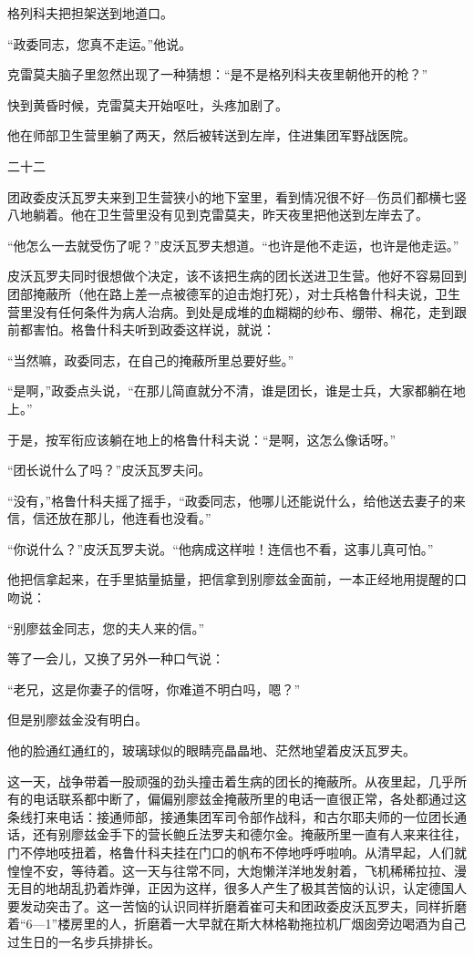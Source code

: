 格列科夫把担架送到地道口。

“政委同志，您真不走运。”他说。

克雷莫夫脑子里忽然出现了一种猜想：“是不是格列科夫夜里朝他开的枪？”

快到黄昏时候，克雷莫夫开始呕吐，头疼加剧了。

他在师部卫生营里躺了两天，然后被转送到左岸，住进集团军野战医院。

二十二

团政委皮沃瓦罗夫来到卫生营狭小的地下室里，看到情况很不好—伤员们都横七竖八地躺着。他在卫生营里没有见到克雷莫夫，昨天夜里把他送到左岸去了。

“他怎么一去就受伤了呢？”皮沃瓦罗夫想道。“也许是他不走运，也许是他走运。”

皮沃瓦罗夫同时很想做个决定，该不该把生病的团长送进卫生营。他好不容易回到团部掩蔽所（他在路上差一点被德军的迫击炮打死），对士兵格鲁什科夫说，卫生营里没有任何条件为病人治病。到处是成堆的血糊糊的纱布、绷带、棉花，走到跟前都害怕。格鲁什科夫听到政委这样说，就说：

“当然嘛，政委同志，在自己的掩蔽所里总要好些。”

“是啊，”政委点头说，“在那儿简直就分不清，谁是团长，谁是士兵，大家都躺在地上。”

于是，按军衔应该躺在地上的格鲁什科夫说：“是啊，这怎么像话呀。”

“团长说什么了吗？”皮沃瓦罗夫问。

“没有，”格鲁什科夫摇了摇手，“政委同志，他哪儿还能说什么，给他送去妻子的来信，信还放在那儿，他连看也没看。”

“你说什么？”皮沃瓦罗夫说。“他病成这样啦！连信也不看，这事儿真可怕。”

他把信拿起来，在手里掂量掂量，把信拿到别廖兹金面前，一本正经地用提醒的口吻说：

“别廖兹金同志，您的夫人来的信。”

等了一会儿，又换了另外一种口气说：

“老兄，这是你妻子的信呀，你难道不明白吗，嗯？”

但是别廖兹金没有明白。

他的脸通红通红的，玻璃球似的眼睛亮晶晶地、茫然地望着皮沃瓦罗夫。

这一天，战争带着一股顽强的劲头撞击着生病的团长的掩蔽所。从夜里起，几乎所有的电话联系都中断了，偏偏别廖兹金掩蔽所里的电话一直很正常，各处都通过这条线打来电话：接通师部，接通集团军司令部作战科，和古尔耶夫师的一位团长通话，还有别廖兹金手下的营长鲍丘法罗夫和德尔金。掩蔽所里一直有人来来往往，门不停地吱扭着，格鲁什科夫挂在门口的帆布不停地呼呼啦响。从清早起，人们就惶惶不安，等待着。这一天与往常不同，大炮懒洋洋地发射着，飞机稀稀拉拉、漫无目的地胡乱扔着炸弹，正因为这样，很多人产生了极其苦恼的认识，认定德国人要发动突击了。这一苦恼的认识同样折磨着崔可夫和团政委皮沃瓦罗夫，同样折磨着“6—1”楼房里的人，折磨着一大早就在斯大林格勒拖拉机厂烟囱旁边喝酒为自己过生日的一名步兵排排长。

